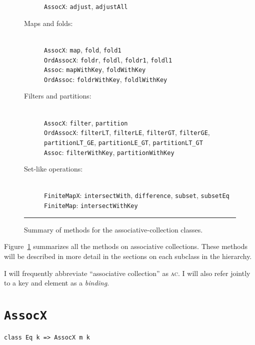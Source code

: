 \documentclass{report}
\newcommand{\cd}{\texttt}
\newcommand{\Figure}[1]{Figure~\ref{#1}}
\newcommand{\nl}{\hspace*{0pt}\\}
\newcommand{\AC}{\textsc{ac}\xspace}
\begin{document}
\begin{figure}
\begin{description}
\cd{AssocX}: \cd{adjust}, \cd{adjustAll}
\item[Maps and folds:] \nl
\cd{AssocX}: \cd{map}, \cd{fold}, \cd{fold1} \\
\cd{OrdAssocX}: \cd{foldr}, \cd{foldl}, \cd{foldr1}, \cd{foldl1} \\
\cd{Assoc}: \cd{mapWithKey}, \cd{foldWithKey} \\
\cd{OrdAssoc}: \cd{foldrWithKey}, \cd{foldlWithKey}
\item[Filters and partitions:] \nl
\cd{AssocX}: \cd{filter}, \cd{partition} \\
\cd{OrdAssocX}:
  \cd{filterLT}, \cd{filterLE}, \cd{filterGT}, \cd{filterGE}, \\
  \hspace*{20pt}
  \cd{partitionLT\_GE}, \cd{partitionLE\_GT}, \cd{partitionLT\_GT} \\
\cd{Assoc}: \cd{filterWithKey}, \cd{partitionWithKey}
\item[Set-like operations:] \nl
\cd{FiniteMapX}: \cd{intersectWith}, \cd{difference}, \cd{subset}, \cd{subsetEq} \\
\cd{FiniteMap}: \cd{intersectWithKey}
\end{description}
\hrule
\caption{Summary of methods for the associative-collection classes.}
\label{assoc-methods}
\end{figure}

\Figure{assoc-methods} summarizes all the methods on associative collections.
These methods will be described in more detail in the sections on each subclass
in the hierarchy.

I will frequently abbreviate ``associative collection'' as \AC.  I
will also refer jointly to a key and element as a \emph{binding}.

\section{\cd{AssocX}}
\begin{verbatim}
class Eq k => AssocX m k
\end{verbatim}
\end{document}
